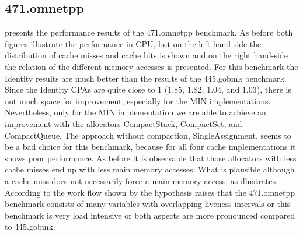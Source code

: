 \documentclass[onecolumn, openright, master, english, signatures]{dbrgrptt}
\begin{document}
\subsection{471.omnetpp}
 presents the performance results of the 471.omnetpp benchmark.
As before both figures illustrate the performance in \ac{CPU}, but on the left hand-side the distribution of cache misses and cache hits is shown and on the right hand-side the relation of the different memory accesses is presented.
For this benchmark the Identity results are much better than the results of the 445.gobmk benchmark.
Since the Identity \ac{CPA}s are quite close to 1 ($1.85$, $1.82$, $1.04$, and $1.03$), there is not much space for improvement, especially for the \ac{MIN} implementations.
Nevertheless, only for the \ac{MIN} implementation we are able to achieve an improvement with the allocators CompactStack, CompactSet, and CompactQueue.
The approach without compaction, SingleAssignment, seems to be a bad choice for this benchmark, because for all four cache implementations it shows poor performance.
As before it is observable that those allocators with less cache misses end up with less main memory accesses.
What is plausible although a cache miss does not necessarily force a main memory access, as  illustrates.
According to the work flow shown by  the hypothesis raises that the 471.omnetpp benchmark consists of many variables with overlapping liveness intervals or this benchmark is very load intensive or both aspects are more pronounced compared to 445.gobmk.
\end{document}
